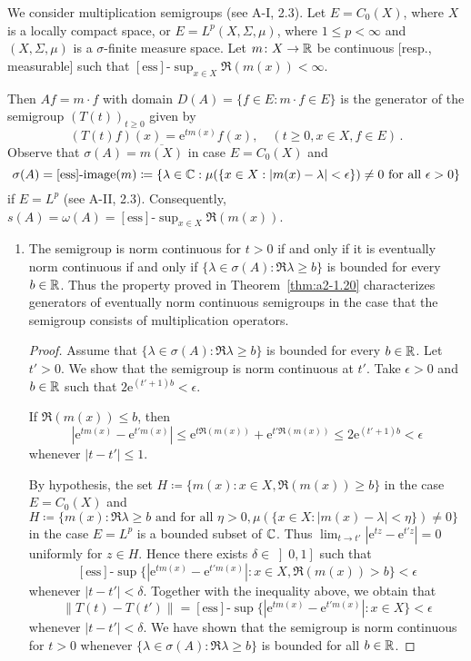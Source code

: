 \begin{example}\label{ex:a2-1.28}
We consider multiplication semigroups (see A-I, 2.3).
Let $E = C_{0}(X)$, where $X$ is a locally compact space, or $E = L^{p}(X,\Sigma,\mu)$, where $1 \leq p < \infty$ and $(X,\Sigma,\mu)$ is a $\sigma$-finite measure space.
Let $m \colon X \to \mathbb{R}$ be continuous [resp., measurable] such that $[\text{ess}]\text{-}\sup_{x \in X} \Re(m(x)) < \infty$.

Then $Af = m \cdot f$ with domain $D(A) = \{f \in E : m \cdot f \in E\}$ is the generator of the semigroup $(T(t))_{t \geq 0}$ given by
\[
    (T(t)f)(x) = \mathrm{e}^{tm(x)}f(x), \quad (t \geq 0, x \in X, f \in E )\, .
\]
Observe that $\sigma(A) = \overline{m(X)}$ in case $E = C_{0}(X)$ 
and 
\[
\sigma(A) = [\text{ess}]\text{-}\text{image}(m) \coloneqq \{\lambda \in \mathbb{C} : \mu(\{x \in X : |m(x)-\lambda| < \epsilon\}) \neq 0 \text{ for all } \epsilon > 0\}
\]
if $E = L^{p}$ (see A-II, 2.3).
Consequently, $s(A) = \omega(A) = [\text{ess}]\text{-}\sup_{x \in X} \Re(m(x))$.

\begin{enumerate}[\upshape (i), wide, labelsep=.5em]
\item \label{ex:a2-1.28-1}
The semigroup is norm continuous for $t > 0$ if and only if it is eventually norm continuous if and only if 
$\{\lambda \in \sigma(A) : \Re\lambda \geq b\}$ 
is bounded for every $b \in \mathbb{R}$.
Thus the property proved in Theorem~\ref{thm:a2-1.20}   characterizes generators of eventually norm continuous semigroups in the case that the semigroup consists of multiplication operators.
\begin{proof}
Assume that $\{\lambda \in \sigma(A) : \Re\lambda \geq b\}$ is bounded for every $b \in \mathbb{R}$.
Let $t' > 0$.
We show that the semigroup is norm continuous at $t'$.
Take $\epsilon > 0$ and $b \in \mathbb{R}$ such that $2\mathrm{e}^{(t'+1)b} < \epsilon$.

If $\Re(m(x)) \leq b$, then
\[
    |\mathrm{e}^{tm(x)} - \mathrm{e}^{t'm(x)}| \leq \mathrm{e}^{t\Re(m(x))} + \mathrm{e}^{t'\Re(m(x))} \leq 2\mathrm{e}^{(t'+1)b} < \epsilon
\]
whenever $|t-t'| \leq 1$.

By hypothesis, the set 
$H \coloneqq \{m(x) : x \in X, \Re(m(x)) \geq b\}$ 
in the case $E = C_{0}(X)$ 
and $H \coloneqq \{m(x) : \Re\lambda \geq b \text{ and for all } \eta > 0, 
\mu(\{x \in X : |m(x)-\lambda| < \eta \}) \neq 0\}$
in the case $E = L^{p}$ 
is a bounded subset of $\mathbb{C}$.
Thus $\lim_{t \to t'} |\mathrm{e}^{tz} - \mathrm{e}^{t'z}| = 0$ 
uniformly for $z \in H$.
Hence there exists $\delta \in \left]0,1\right]$ such that
\[
[\text{ess}]\text{-}\sup\{|\mathrm{e}^{tm(x)} - \mathrm{e}^{t'm(x)}| : x \in X, \Re(m(x)) > b\} < \epsilon
\] 
whenever $|t-t'| < \delta$.
Together with the inequality above, we obtain that 
\[
\|T(t) - T(t')\| = [\text{ess}]\text{-}\sup\{|\mathrm{e}^{tm(x)} - \mathrm{e}^{t'm(x)}| : x \in X\} < \epsilon
\]
whenever $|t-t'| < \delta$.
We have shown that the semigroup is norm continuous for $t > 0$ whenever $\{\lambda \in \sigma(A) : \Re\lambda \geq b\}$ is bounded for all $b \in \mathbb{R}$.
\end{proof}


\end{enumerate}
\end{example}

